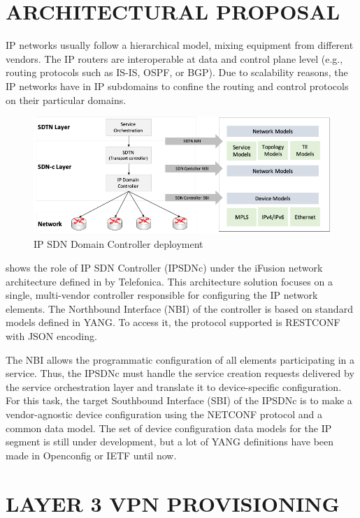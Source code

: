 \documentclass[conference]{IEEEtran}
\begin{document}
\section{ARCHITECTURAL PROPOSAL}
\label{sect:arqu}

IP networks usually follow a hierarchical model, mixing equipment from different vendors. The IP routers are interoperable at data and control plane level (e.g., routing protocols such as IS-IS, OSPF, or BGP). Due to scalability reasons, the IP networks have in IP subdomains to confine the routing and control protocols on their particular domains.

\begin{figure}
	\centering
		\includegraphics[width=\linewidth]{fig1_architecture.png}
	\caption{IP SDN Domain Controller deployment}
	\label{FIG:1}
\end{figure}


 shows the role of IP SDN Controller (IPSDNc) under the iFusion network architecture defined in \cite{contreras2019ifusion} by Telefonica. This architecture solution focuses on a single, multi-vendor controller responsible for configuring the IP network elements. The Northbound Interface (NBI) of the controller is based on standard models defined in YANG. To access it, the protocol supported is RESTCONF with JSON encoding.

The NBI allows the programmatic configuration of all elements participating in a service. Thus, the IPSDNc must handle the service creation requests delivered by the service orchestration layer and translate it to device-specific configuration. For this task, the target Southbound Interface (SBI) of the IPSDNc is to make a vendor-agnostic device configuration using the NETCONF protocol and a common data model. The set of device configuration data models for the IP segment is still under development, but a lot of YANG definitions have been made in Openconfig or IETF until now. 

\section{LAYER 3 VPN PROVISIONING}
\label{sect:l3vpn}
\end{document}
